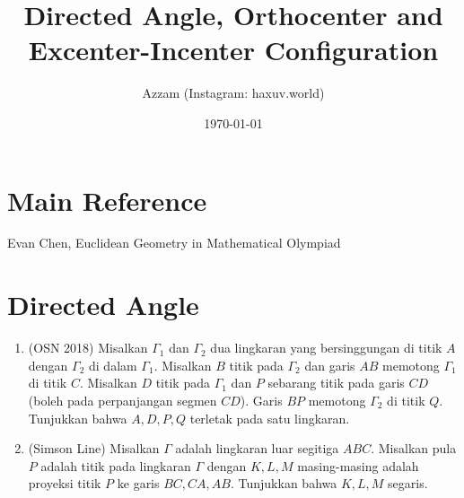 \documentclass[12pt]{scrartcl}
\title{Directed Angle, Orthocenter and Excenter-Incenter Configuration}
\author{Azzam (Instagram: haxuv.world)}
\date{\today}
\begin{document}
\maketitle

\renewcommand*\contentsname{Daftar Isi}
\tableofcontents

\newpage

\section{Main Reference}
Evan Chen, Euclidean Geometry in Mathematical Olympiad

\section{Directed Angle}
\begin{enumerate}
    \item (OSN 2018) Misalkan $\Gamma_1$ dan $\Gamma_2$ dua lingkaran yang bersinggungan di titik $A$ dengan $\Gamma_2$ di dalam $\Gamma_1$. Misalkan $B$ titik pada $\Gamma_2$ dan garis $AB$ memotong $\Gamma_1$ di titik $C$. Misalkan $D$ titik pada $\Gamma_1$ dan $P$ sebarang titik pada garis $CD$ (boleh pada perpanjangan segmen $CD$). Garis $BP$ memotong $\Gamma_2$ di titik $Q$. Tunjukkan bahwa $A, D, P, Q$ terletak pada satu lingkaran.

    \item (Simson Line) Misalkan $\Gamma$ adalah lingkaran luar segitiga $ABC$. Misalkan pula $P$ adalah titik pada lingkaran $\Gamma$ dengan $K,L,M$ masing-masing adalah proyeksi titik $P$ ke garis $BC,CA,AB$. Tunjukkan bahwa $K,L,M$ segaris.
\end{enumerate}
\end{document}
